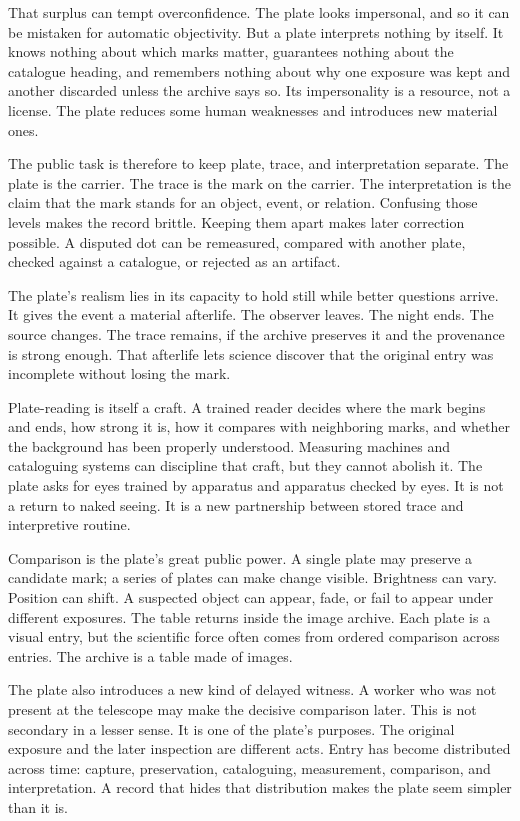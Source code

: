 That surplus can tempt overconfidence. The plate looks impersonal, and so it
can be mistaken for automatic objectivity. But a plate interprets nothing by
itself. It knows nothing about which marks matter, guarantees nothing about
the catalogue heading, and remembers nothing about why one exposure was
kept and another discarded unless the archive says so. Its impersonality is a
resource, not a license. The plate reduces some human weaknesses and introduces
new material ones.

The public task is therefore to keep plate, trace, and interpretation
separate. The plate is the carrier. The trace is the mark on the carrier. The
interpretation is the claim that the mark stands for an object, event, or
relation. Confusing those levels makes the record brittle. Keeping them apart
makes later correction possible. A disputed dot can be remeasured, compared
with another plate, checked against a catalogue, or rejected as an artifact.

The plate's realism lies in its capacity to hold still while better questions
arrive. It gives the event a material afterlife. The observer leaves. The night
ends. The source changes. The trace remains, if the archive preserves it and
the provenance is strong enough. That afterlife lets science discover that the
original entry was incomplete without losing the mark.

Plate-reading is itself a craft. A trained reader decides where the mark
begins and ends, how strong it is, how it compares with neighboring marks,
and whether the background has been properly understood. Measuring
machines and cataloguing systems can discipline that craft, but they
cannot abolish it. The plate asks
for eyes trained by apparatus and apparatus checked by eyes. It is not a return
to naked seeing. It is a new partnership between stored trace and interpretive
routine.

Comparison is the plate's great public power. A single plate may preserve a
candidate mark; a series of plates can make change visible. Brightness can vary.
Position can shift. A suspected object can appear, fade, or fail to appear
under different exposures. The table returns inside the image archive. Each
plate is a visual entry, but the scientific force often comes from ordered
comparison across entries. The archive is a table made of images.

The plate also introduces a new kind of delayed witness. A worker who was not
present at the telescope may make the decisive comparison later. This is not
secondary in a lesser sense. It is one of the plate's purposes. The original
exposure and the later inspection are different acts. Entry has become
distributed across time: capture, preservation, cataloguing, measurement,
comparison, and interpretation. A record that hides that distribution makes the
plate seem simpler than it is.

